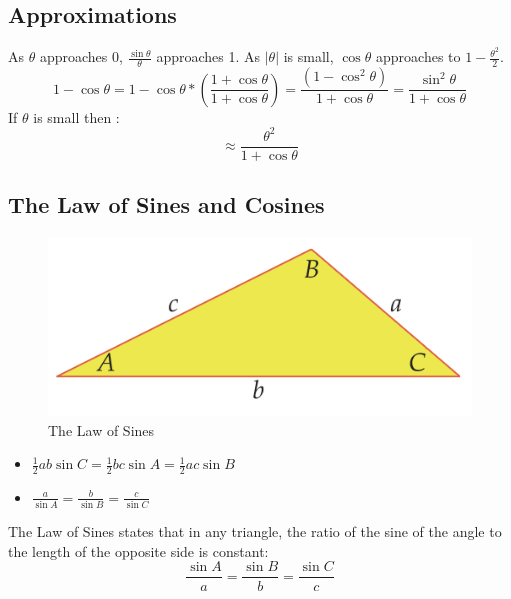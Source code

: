\subsection{Approximations}
As $ \theta $ approaches 0, $ \frac{\sin \theta}{\theta} $ approaches 1.
As $ |\theta| $ is small, $ \cos \theta $ approaches to  $1 - \frac{\theta^2}{2} $.
\begin{displaymath}
    1 - \cos \theta = 1 - \cos \theta * (\frac{1 + \cos \theta}{1 + \cos \theta}) = \frac{(1 - \cos^2 \theta)}{1 + \cos \theta} = \frac{\sin^2 \theta}{1 + \cos \theta}
\end{displaymath}
If $ \theta$ is small then :
\begin{displaymath}
  \approx  \frac{\theta ^{2}}{1+ \cos \theta}
\end{displaymath}

\subsection{The Law of Sines and Cosines}
\begin{figure}
    \centering
    \includegraphics[scale=0.5]{pics/32.png}
    \caption{The Law of Sines}
\end{figure}
\begin{itemize}
    \item $ \frac{1}{2} ab \sin C = \frac{1}{2}bc\sin A = \frac{1}{2}ac\sin B$
    \item $ \frac{a}{\sin A} = \frac{b}{\sin B} = \frac{c}{\sin C}$
\end{itemize}
The Law of Sines states that in any triangle, the ratio of the sine of the angle to the length of the opposite side is constant:
\[ \frac{\sin A}{a} = \frac{\sin B}{b} = \frac{\sin C}{c} \]

